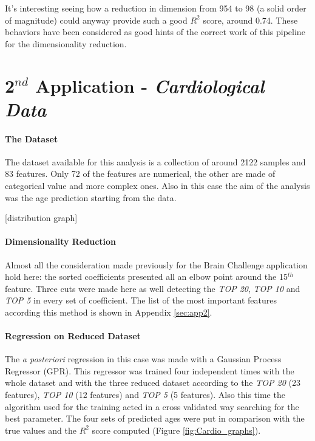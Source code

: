 \documentclass{article}
\begin{document}
It's interesting seeing how a reduction in dimension from 954 to 98 (a solid order of magnitude) could anyway provide such a good $R^2$ score, around 0.74. These behaviors have been considered as good hints of the correct work of this pipeline for the dimensionality reduction.

\section*{2$^{nd}$ Application - \emph{Cardiological Data}}

\paragraph{The Dataset} The dataset available for this analysis is a collection of around 2122 samples and 83 features. Only 72 of the features are numerical, the other are made of categorical value and more complex ones. Also in this case the aim of the analysis was the age prediction starting from the data.

[distribution graph]

\paragraph{Dimensionality Reduction} Almost all the consideration made previously for the Brain Challenge application hold here: the sorted coefficients presented all an elbow point around the 15$^{th}$ feature. Three cuts were made here as well detecting the \emph{TOP 20}, \emph{TOP 10} and \emph{TOP 5} in every set of coefficient. The list of the most important features according this method is shown in Appendix \ref{sec:app2}.

\paragraph{Regression on Reduced Dataset} The \emph{a posteriori} regression in this case was made with a Gaussian Process Regressor (GPR). This regressor was trained four independent times with the whole dataset and with the three reduced dataset according to the \emph{TOP 20} (23 features), \emph{TOP 10} (12 features)  and \emph{TOP 5} (5 features). Also this time the algorithm used for the training acted in a cross validated way searching for the best parameter. The four sets of predicted ages were put in comparison with the true values and the $R^2$ score computed (Figure \ref{fig:Cardio_graphs}).
\end{document}
